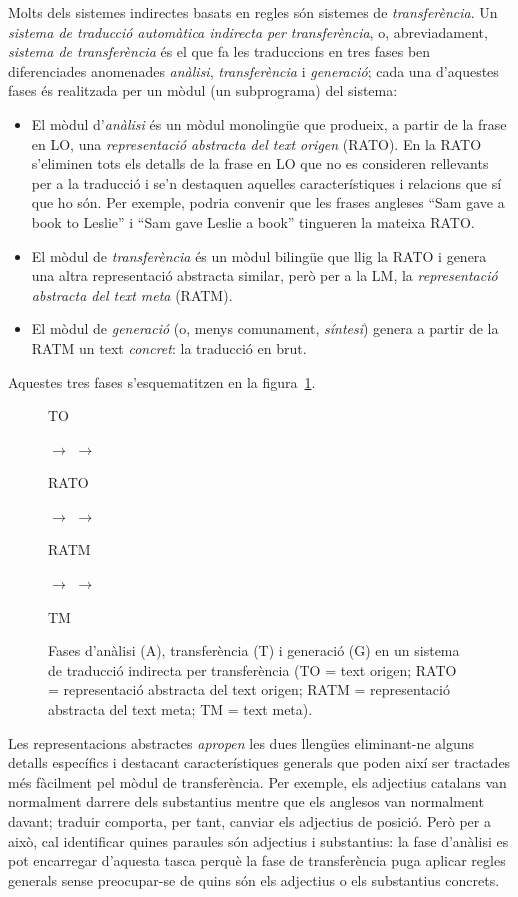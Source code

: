 Molts dels sistemes indirectes basats en regles són sistemes de
\emph{transferència}. Un \emph{sistema de traducció automàtica
  indirecta per transferència}, o, abreviadament, \emph{sistema de
  transferència} és el que fa les traduccions en tres fases ben
diferenciades anomenades \emph{anàlisi}, \emph{transferència} i
\emph{generació}; cada una d'aquestes fases és realitzada per un mòdul
(un subprograma) del sistema:
\begin{itemize}
\item El mòdul d'\emph{anàlisi} és un mòdul monolingüe que produeix, a
  partir de la frase en LO, una \emph{representació abstracta del text
    origen} (RATO). En la RATO s'eliminen tots els detalls de la frase
  en LO que no es consideren rellevants per a la traducció i se'n
  destaquen aquelles característiques i relacions que sí que ho són.
  Per exemple, podria convenir que les frases angleses ``Sam gave a
  book to Leslie'' i ``Sam gave Leslie a book'' \citep{arnold93j}
  tingueren la mateixa RATO.
\item El mòdul de \emph{transferència} és un mòdul bilingüe que llig
  la RATO i genera una altra representació abstracta similar, però per
  a la LM, la \emph{representació abstracta del text meta} (RATM).
\item El mòdul de \emph{generació} (o, menys comunament,
  \emph{síntesi}) genera a partir de la RATM un text \emph{concret}:
  la traducció en brut.
\end{itemize}
Aquestes tres fases s'esquematitzen en la figura~\ref{fg:transfer}.


\begin{figure}
\begin{center}
\parbox{0.5cm}{TO} $\to$
 $\to$ 
\parbox{1.0cm}{RATO} $\to$
 $\to$
\parbox{1.25cm}{RATM} $\to$
 $\to$
\parbox{0.5cm}{TM} 
\end{center}
\caption{Fases d'anàlisi (A), transferència (T) i generació (G) en un
  sistema de traducció indirecta per transferència (TO = text origen;
  RATO = representació abstracta del text origen; RATM = representació
  abstracta del text meta; TM = text meta).}
\label{fg:transfer} 
\end{figure}

Les representacions abstractes \emph{apropen} les dues llengües
eliminant-ne alguns detalls específics i destacant característiques
generals que poden així ser tractades més fàcilment pel mòdul de
transferència. Per exemple, els adjectius catalans van normalment
darrere dels substantius mentre que els anglesos van normalment
davant; traduir comporta, per tant, canviar els adjectius de
posició. Però per a això, cal identificar quines paraules són
adjectius i substantius: la fase d'anàlisi es pot encarregar d'aquesta
tasca perquè la fase de transferència puga aplicar regles generals
sense preocupar-se de quins són els adjectius o els substantius
concrets.

